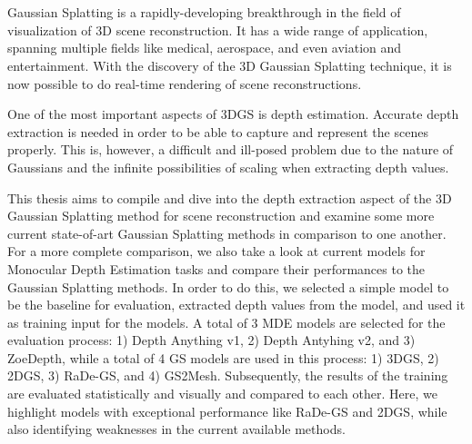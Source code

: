 \chapter{\abstractname}

Gaussian Splatting is a rapidly-developing breakthrough in the field of visualization of 3D scene reconstruction. It has a wide range of application, spanning multiple fields like medical, aerospace, and even aviation and entertainment. With the discovery of the 3D Gaussian Splatting technique, it is now possible to do real-time rendering of scene reconstructions.

One of the most important aspects of 3DGS is depth estimation. Accurate depth extraction is needed in order to be able to capture and represent the scenes properly. This is, however, a difficult and ill-posed problem due to the nature of Gaussians and the infinite possibilities of scaling when extracting depth values.

This thesis aims to compile and dive into the depth extraction aspect of the 3D Gaussian Splatting method for scene reconstruction and examine some more current state-of-art Gaussian Splatting methods in comparison to one another. For a more complete comparison, we also take a look at current models for Monocular Depth Estimation tasks and compare their performances to the Gaussian Splatting methods. In order to do this, we selected a simple model to be the baseline for evaluation, extracted depth values from the model, and used it as training input for the models. A total of 3 MDE models are selected for the evaluation process: 1) Depth Anything v1, 2) Depth Antyhing v2, and 3) ZoeDepth, while a total of 4 GS models are used in this process: 1) 3DGS, 2) 2DGS, 3) RaDe-GS, and 4) GS2Mesh. Subsequently, the results of the training are evaluated statistically and visually and compared to each other. Here, we highlight models with exceptional performance like RaDe-GS and 2DGS, while also identifying weaknesses in the current available methods.

\medskip
{}
